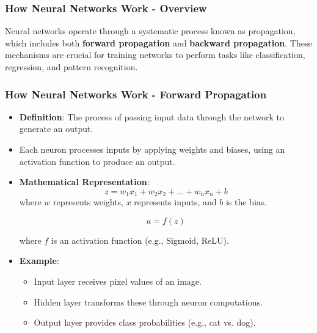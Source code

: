 \documentclass[aspectratio=169]{beamer}
\begin{document}
\begin{frame}[fragile]
    \frametitle{How Neural Networks Work - Overview}
    Neural networks operate through a systematic process known as propagation, which includes both \textbf{forward propagation} and \textbf{backward propagation}. These mechanisms are crucial for training networks to perform tasks like classification, regression, and pattern recognition.
\end{frame}

\begin{frame}[fragile]
    \frametitle{How Neural Networks Work - Forward Propagation}
    \begin{itemize}
        \item \textbf{Definition}: The process of passing input data through the network to generate an output.
        \item Each neuron processes inputs by applying weights and biases, using an activation function to produce an output.
        
        \item \textbf{Mathematical Representation}:
        \begin{equation}
        z = w_1x_1 + w_2x_2 + ... + w_nx_n + b
        \end{equation}
        where \(w\) represents weights, \(x\) represents inputs, and \(b\) is the bias.
        
        \begin{equation}
        a = f(z)
        \end{equation}
        
        where \(f\) is an activation function (e.g., Sigmoid, ReLU).

        \item \textbf{Example}: 
        \begin{itemize}
            \item Input layer receives pixel values of an image.
            \item Hidden layer transforms these through neuron computations.
            \item Output layer provides class probabilities (e.g., cat vs. dog).
        \end{itemize}
    \end{itemize}
\end{frame}
\end{document}
